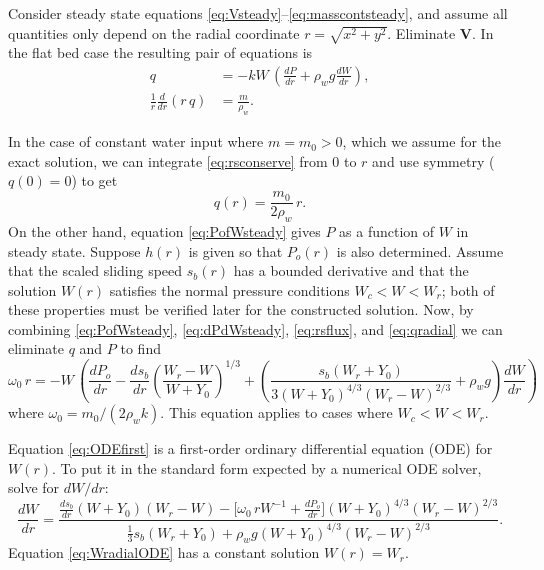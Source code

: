 \documentclass[11pt,final]{amsart}
\newcommand\bV{\mathbf{V}}
\begin{document}
Consider steady state equations \eqref{eq:Vsteady}--\eqref{eq:masscontsteady}, and assume all quantities only depend on the radial coordinate $r = \sqrt{x^2+y^2}$.  Eliminate $\bV$.  In the flat bed case the resulting pair of equations is
\begin{align}
q &= - k W\, \left(\frac{dP}{dr} + \rho_w g \frac{dW}{dr}\right), \label{eq:rsflux} \\
\frac{1}{r}\frac{d}{dr}\left(r\,q\right) &= \frac{m}{\rho_w}. \label{eq:rsconserve}
\end{align}

In the case of constant water input where $m = m_0 > 0$, which we assume for the exact solution, we can integrate \eqref{eq:rsconserve} from $0$ to $r$ and use symmetry ($q(0)=0$) to get
\begin{equation}
q(r) = \frac{m_0}{2\rho_w} \, r. \label{eq:qradial}
\end{equation}
On the other hand, equation \eqref{eq:PofWsteady} gives $P$ as a function of $W$ in steady state.  Suppose $h(r)$ is given so that $P_o(r)$ is also determined.  Assume that the scaled sliding speed $s_b(r)$ has a bounded derivative and that the solution $W(r)$ satisfies the normal pressure conditions $W_c < W < W_r$; both of these properties must be verified later for the constructed solution.  Now, by combining \eqref{eq:PofWsteady}, \eqref{eq:dPdWsteady}, \eqref{eq:rsflux}, and \eqref{eq:qradial} we can eliminate $q$ and $P$ to find
\begin{equation}
\omega_0\, r = - W\, \left(\frac{dP_o}{dr} - \frac{ds_b}{dr} \left(\frac{W_r - W}{W+Y_0}\right)^{1/3} + \left(\frac{s_b (W_r + Y_0)}{3 (W+Y_0)^{4/3} (W_r - W)^{2/3}} + \rho_w g\right) \frac{dW}{dr}\right)  \label{eq:ODEfirst}
\end{equation}
where $\omega_0 = m_0 / (2 \rho_w k)$.  This equation applies to cases where $W_c < W < W_r$.

Equation \eqref{eq:ODEfirst} is a first-order ordinary differential equation (ODE) for $W(r)$.  To put it in the standard form expected by a numerical ODE solver, solve for $dW/dr$:
\begin{equation}
\frac{dW}{dr} = \frac{\frac{ds_b}{dr} (W+Y_0) (W_r - W) - \Big[\omega_0\, r W^{-1} + \frac{dP_o}{dr}\Big] (W + Y_0)^{4/3} \left(W_r - W\right)^{2/3}}{\frac{1}{3} s_b (W_r + Y_0) + \rho_w g (W + Y_0)^{4/3} (W_r - W)^{2/3}}.
\label{eq:WradialODE}
\end{equation}
Equation \eqref{eq:WradialODE} has a constant solution $W(r)=W_r$.
\end{document}
